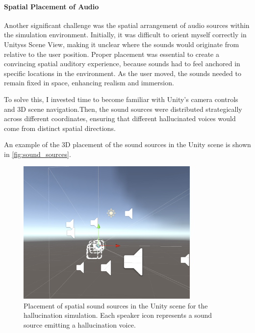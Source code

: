 \paragraph{Spatial Placement of Audio } 
Another significant challenge was the spatial arrangement of audio sources within the simulation environment. Initially, it was difficult to orient myself correctly in Unityss Scene View, making it unclear where the sounds would originate from relative to the user position. Proper placement was essential to create a convincing spatial auditory experience, because sounds had to feel anchored in specific locations in the environment. As the user moved, the sounds needed to remain fixed in space, enhancing realism and immersion.

To solve this, I invested time to become familiar with Unity's camera controls and 3D scene navigation.Then, the sound sources were distributed strategically across different coordinates, ensuring that different hallucinated voices would come from distinct spatial directions.

An example of the 3D placement of the sound sources in the Unity scene is shown in \autoref{fig:sound_sources}.

\begin{figure}[h!] \centering \includegraphics[width=0.8\textwidth]{../../Figures/unity-scene.png} \caption{Placement of spatial sound sources in the Unity scene for the hallucination simulation. Each speaker icon represents a sound source emitting a hallucination voice.} \label{fig:sound_sources} \end{figure}

